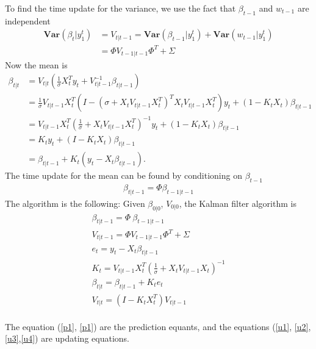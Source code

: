 \documentclass{article}
\theoremstyle{plain}
\theoremstyle{definition}
\theoremstyle{remark}
\newcommand{\Var}{\mathbf{Var}}
\begin{document}
To find the time update for the variance, we use the fact that $\beta_{t-1}$ and $w_{t-1}$ are independent
\begin{equation}
\begin{split}
\Var(\beta_t|y^t_1) &= V_{t|t-1} = \Var(\beta_{t-1}|y^t_1) + \Var(w_{t-1}|y^t_1)\\
&= \Phi V_{t-1|t-1}\Phi ^T + \Sigma
\end{split}
\end{equation}
Now the mean is
\begin{equation}
\begin{split}
\beta_{t|t} &= V_{t|t} ( \frac1\sigma X_t^T y_t + V_{t|t-1}^{-1} \beta_{t|t-1})\\
&= \frac1\sigma V_{t|t-1} X_t^T (I - (\sigma + X_t V_{t|t-1} X_t^T )^T X_t  V_{t|t-1} X_t^T) y_t+ (1-K_t X_t) \beta_{t|t-1}\\
&= V_{t|t-1} X_t^T ( \frac1\sigma + X_t V_{t|t-1} X_t^T)^{-1} y_t + (1-K_t X_t) \beta_{t|t-1}\\
&= K_t y_t + (I - K_t X_t) \beta_{t|t-1}\\
&= \beta_{t|t-1}+ K_t (y_t - X_t \beta_{t|t-1}).
\end{split}
\end{equation}
The time update for the mean can be found by conditioning on $\beta_{t-1}$
\begin{equation}
\begin{split}
\beta_{t|t-1} =\Phi  \beta_{t-1|t-1}
\end{split}
\end{equation}
The algorithm is the following:
Given $\beta_{0|0}$, $V_{0|0}$, the Kalman filter algorithm is
\begin{eqnarray}
\beta_{t|t-1} = \Phi \: \beta_{t-1|t-1}\label{p1}\\
V_{t|t-1} = \Phi  V_{t-1|t-1} \Phi ^T + \Sigma \label{p2}\\
e_t = y_t -  X_t \beta_{t|t-1} \label{u1}\\
K_t =  V_{t|t-1} X_t^T (\frac1\sigma + X_t V_{t|t-1} X_t )^{-1}\label{u4}\\
\beta_{t|t} = \beta_{t|t-1} + K_t e_t\label{u2}\\
V_{t|t} = (I - K_t X_t^T) V_{t|t-1}\label{u3}\\
\end{eqnarray}

The equation (\ref{p1}, \ref{p1}) are the prediction equants, and the equations (\ref{u1}, \ref{u2}, \ref{u3},\ref{u4}) are updating equations.
\end{document}

